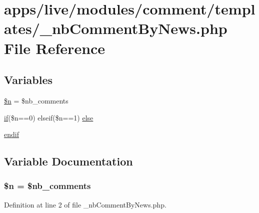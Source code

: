 \hypertarget{live_2modules_2comment_2templates_2__nb_comment_by_news_8php}{\section{apps/live/modules/comment/templates/\-\_\-nb\-Comment\-By\-News.php File Reference}
\label{live_2modules_2comment_2templates_2__nb_comment_by_news_8php}
}
\subsection*{Variables}
\begin{DoxyCompactItemize}
\item 
\hyperlink{live_2modules_2comment_2templates_2__nb_comment_by_news_8php_aa5fae90470d460a65d5211ec08e6b05c}{\$n} = \$nb\-\_\-comments
\item 
\hyperlink{live_2modules_2tournament_2templates_2__form_team_8php_ae30a307b320d8da5d9a945eaf68f7549}{if}(\$n==0) elseif(\$n==1) \hyperlink{live_2modules_2comment_2templates_2__nb_comment_by_news_8php_ae7613bd21a0012539bb81f956b9e0e5f}{else}
\item 
\hyperlink{live_2modules_2comment_2templates_2__nb_comment_by_news_8php_a82cd33ca97ff99f2fcc5e9c81d65251b}{endif}
\end{DoxyCompactItemize}


\subsection{Variable Documentation}
\hypertarget{live_2modules_2comment_2templates_2__nb_comment_by_news_8php_aa5fae90470d460a65d5211ec08e6b05c}{
\subsubsection[{\$n}]{\setlength{\rightskip}{0pt plus 5cm}\$n = \$nb\-\_\-comments}}\label{live_2modules_2comment_2templates_2__nb_comment_by_news_8php_aa5fae90470d460a65d5211ec08e6b05c}


Definition at line 2 of file \-\_\-nb\-Comment\-By\-News.\-php.

